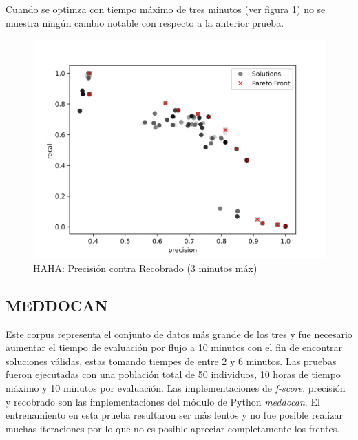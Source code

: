 Cuando se optimza con tiempo m\'aximo de tres minutos (ver figura \ref{impl:fig:haha:precision_vs_recall_3min}) no se muestra ning\'un cambio notable con respecto a la anterior prueba. 

\begin{figure}[ht]
    \centering
    \includegraphics[scale=0.65]{Pictures/haha_precision_vs_recall_3min.jpg}
    \caption{HAHA: Precisi\'on contra Recobrado (3 minutos m\'ax)}
    \label{impl:fig:haha:precision_vs_recall_3min}
\end{figure}

\subsection{MEDDOCAN}
Este corpus representa el conjunto de datos m\'as grande de los tres y  fue necesario aumentar el tiempo de evaluaci\'on por flujo a 10 minutos con el fin de encontrar soluciones v\'alidas, estas tomando tiempes de entre 2 y 6 minutos. Las pruebas fueron ejecutadas con una poblaci\'on total de 50 individuos, 10 horas de tiempo m\'aximo y 10 minutos por evaluaci\'on. 
Las implementaciones de \textit{f-score}, precisi\'on y recobrado son las implementaciones del m\'odulo de Python \textit{meddocan}.
El entrenamiento en esta prueba resultaron ser m\'as lentos y no fue posible realizar muchas iteraciones por lo que no es posible apreciar completamente los frentes.


